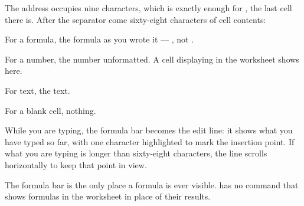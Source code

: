 \begin{ccfigure}
\caption{The formula bar, showing a formula cell}
\label{fig:formulabar}
\end{ccfigure}

The address occupies nine characters, which is exactly enough for ,
the last cell there is. After the separator come sixty-eight characters of cell
contents:

\begin{ccsteps}
\item For a formula, the formula as you wrote it --- , not
.
\item For a number, the number unformatted. A cell displaying  in
the worksheet shows  here.
\item For text, the text.
\item For a blank cell, nothing.
\end{ccsteps}

While you are typing, the formula bar becomes the edit line: it shows what you
have typed so far, with one character highlighted to mark the insertion point.
If what you are typing is longer than sixty-eight characters, the line scrolls
horizontally to keep that point in view.

\begin{ccnote}
The formula bar is the only place a formula is ever visible. \ccprod{} has no
command that shows formulas in the worksheet in place of their results.
\end{ccnote}

